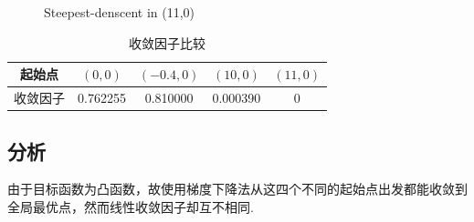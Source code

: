 \begin{figure}[H]
\centering
{}

\caption{Steepest-denscent in (11,0)}
\label{Fig.lable}
\end{figure}

\begin{table}[H]
\centering
\caption{收敛因子比较}
	\begin{tabular}{ccccc}
	\toprule
	{起始点}&$(0,0)$&$(-0.4,0)$&$(10,0)$&$(11,0)$\\
	\midrule
	{收敛因子}&0.762255&0.810000&0.000390&0\\
	\bottomrule
	\end{tabular}
\end{table}

\newpage
\subsection{分析}
由于目标函数为凸函数，故使用梯度下降法从这四个不同的起始点出发都能收敛到全局最优点，然而线性收敛因子却互不相同.

